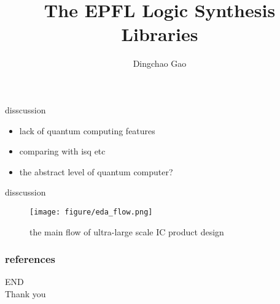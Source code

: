 \documentclass[aspectratio=1610]{beamer}
\title[logic synthesis libraries]{The EPFL Logic Synthesis Libraries}
\author[Gcc]{Dingchao Gao}
\institute[ISCAS]{Institute of Software Chinese Academy of Sciences}
\begin{document}
\begin{frame}[plain]
  \titlepage
\end{frame}

\begin{frame}{disscussion}
  \begin{itemize}
    \item lack of quantum computing features
    \item comparing with isq etc
    \item the abstract level of quantum computer? 
  \end{itemize}
\end{frame}
\begin{frame}{disscussion}
  \begin{figure}
    \centering
    \texttt{[image: figure/eda\_flow.png]}
    \caption{the main flow of ultra-large scale IC product design}
  \end{figure}
\end{frame}
\begin{frame}
	\frametitle{references}
	\printbibliography
\end{frame}

\begin{frame}
\centering
\Huge{END\\Thank you}
\end{frame}
\end{document}
